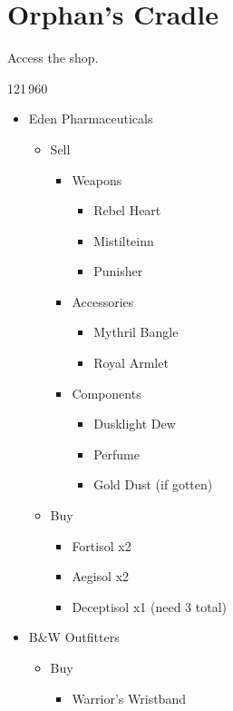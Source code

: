 \chapter{Orphan's Cradle}

Access the shop.

\begin{shop}{121\,960}
	\begin{itemize}
		\item Eden Pharmaceuticals
			\begin{itemize}
				\item Sell
					\begin{itemize}
						\item Weapons
							\begin{itemize}
								\item Rebel Heart
								\item Mistilteinn
								\item Punisher
							\end{itemize}
						\item Accessories
							\begin{itemize}
								\item Mythril Bangle
								\item Royal Armlet
							\end{itemize}
						\item Components
							\begin{itemize}
								\item Dusklight Dew
								\item Perfume
								\item Gold Dust (if gotten)
							\end{itemize}
					\end{itemize}
				\item Buy
					\begin{itemize}
						\item Fortisol x2
						\item Aegisol x2
						\item Deceptisol x1 (need 3 total)
					\end{itemize}
			\end{itemize}
		\item B\&W Outfitters
			\begin{itemize}
				\item Buy
					\begin{itemize}
						\item Warrior's Wristband
					\end{itemize}

\end{itemize}
\end{itemize}
\end{shop}
